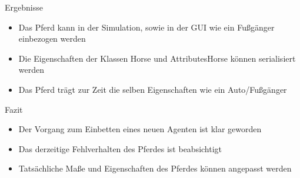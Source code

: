\begin{frame}{Ergebnisse}
	\begin{itemize}
		\item	Das Pferd kann in der Simulation, sowie in der GUI wie ein Fußgänger einbezogen werden
		\item Die Eigenschaften der Klassen Horse und AttributesHorse können serialisiert werden
		\item Das Pferd trägt zur Zeit die selben Eigenschaften wie ein Auto/Fußgänger
	\end{itemize}
\end{frame}

\begin{frame}{Fazit}
	\begin{itemize}
		\item Der Vorgang zum Einbetten eines neuen Agenten ist klar geworden
		\item Das derzeitige Fehlverhalten des Pferdes ist beabsichtigt
		\item Tatsächliche Maße und Eigenschaften des Pferdes können angepasst werden
	\end{itemize}
\end{frame}
